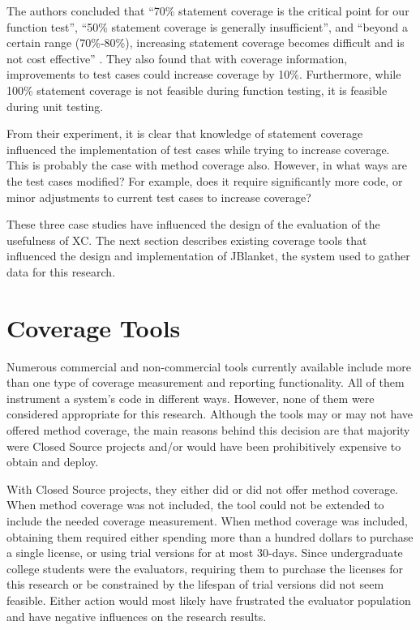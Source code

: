 The authors concluded that ``70\% statement coverage is the critical point
for our function test'', ``50\% statement coverage is generally
insufficient'', and ``beyond a certain range (70\%-80\%), increasing
statement coverage becomes difficult and is not cost effective''
\cite{Piwowarski:1993}.  They also found that with coverage information,
improvements to test cases could increase coverage by 10\%.  Furthermore,
while 100\% statement coverage is not feasible during function testing, it
is feasible during unit testing.

From their experiment, it is clear that knowledge of statement coverage
influenced the implementation of test cases while trying to increase
coverage.  This is probably the case with method coverage also.  However,
in what ways are the test cases modified?  For example, does it require
significantly more code, or minor adjustments to current test cases to
increase coverage?

These three case studies have influenced the design of the evaluation of
the usefulness of XC.  The next section describes existing coverage tools
that influenced the design and implementation of JBlanket, the system used
to gather data for this research.

\section{Coverage Tools}
Numerous commercial and non-commercial tools currently available include
more than one type of coverage measurement and reporting functionality.
All of them instrument a system's code in different ways.  However, none of
them were considered appropriate for this research.  Although the tools may
or may not have offered method coverage, the main reasons behind this
decision are that majority were Closed Source projects and/or would have
been prohibitively expensive to obtain and deploy.

With Closed Source projects, they either did or did not offer method
coverage. When method coverage was not included, the tool could not be
extended to include the needed coverage measurement.  When method coverage
was included, obtaining them required either spending more than a hundred
dollars to purchase a single license, or using trial versions for at most
30-days.  Since undergraduate college students were the evaluators,
requiring them to purchase the licenses for this research or be constrained
by the lifespan of trial versions did not seem feasible.  Either action
would most likely have frustrated the evaluator population and have
negative influences on the research results.

